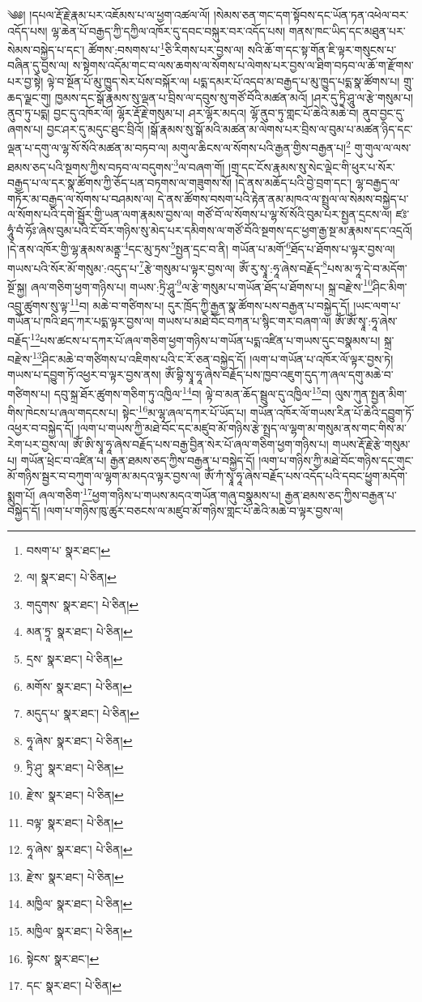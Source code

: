 \setcounter{footnote}{0} 
༄༅། །དཔལ་རྡོ་རྗེ་རྣམ་པར་འཇོམས་པ་ལ་ཕྱག་འཚལ་ལོ། །སེམས་ཅན་གང་དག་སྟོབས་དང་ཡོན་ཏན་འཕེལ་བར་འདོད་པས། ལྷ་ཆེན་པོ་བརྒྱད་ཀྱི་དཀྱིལ་འཁོར་དུ་དབང་བསྐུར་བར་འདོད་པས། གནས་ཁང་ཡིད་དང་མཐུན་པར་སེམས་བསྐྱེད་པ་དང་། ཚོགས་:བསགས་པ་\footnote{བསག་པ་  སྣར་ཐང་། }ཅི་རིགས་པར་བྱས་ལ། སའི་ཆོ་ག་དང་སྟ་གོན་ཇི་ལྟར་གསུངས་པ་བཞིན་དུ་བྱས་ལ། ས་སྟེགས་འདོམ་གང་བ་ལས་ཆགས་ལ་སོགས་པ་ལེགས་པར་བྱས་ལ་ཐིག་བཏབ་ལ་ཆོ་ག་རྫོགས་པར་བྱ་སྟེ། ལྟེ་བ་སྔོན་པོ་མུ་ཁྱུད་སེར་པོས་བསྐོར་ལ། པདྨ་དམར་པོ་འདབ་མ་བརྒྱད་པ་མུ་ཁྱུད་པདྨ་སྣ་ཚོགས་པ། གྲུ་ཆད་ལྗང་གུ། ཁྱམས་དང་སྒོ་རྣམས་སུ་ལྡན་པ་བྲིས་ལ་དབུས་སུ་གཙོ་བོའི་མཚན་མའོ། །ཤར་དུ་ཏྲི་ཤཱུ་ལ་རྩེ་གསུམ་པ། ནུབ་ཏུ་པདྨ། བྱང་དུ་འཁོར་ལོ། ལྷོར་རྡོ་རྗེ་གསུམ་པ། ཤར་ལྷོར་མདའ། ལྷོ་ནུབ་ཏུ་གླང་པོ་ཆེའི་མཆེ་བ། ནུབ་བྱང་དུ་ཞགས་པ། བྱང་ཤར་དུ་མདུང་ཐུང་བྲིའོ། །སྒོ་རྣམས་སུ་སྒོ་མའི་མཚན་མ་ལེགས་པར་བྲིས་ལ་བུམ་པ་མཚན་ཉིད་དང་ལྡན་པ་དགུ་ལ་ལྷ་སོ་སོའི་མཚན་མ་བཏབ་ལ། མགུལ་ཆིངས་ལ་སོགས་པའི་རྒྱན་གྱིས་བརྒྱན་པ།\footnote{ལ།  སྣར་ཐང་།  པེ་ཅིན། } གུ་གུལ་ལ་ལས་ཐམས་ཅད་པའི་སྔགས་ཀྱིས་བཏབ་ལ་བདུགས་\footnote{གདུགས་  སྣར་ཐང་།  པེ་ཅིན། }ལ་བཞག་གོ། །གྲྭ་དང་ངོས་རྣམས་སུ་སེང་ལྡེང་གི་ཕུར་པ་སོར་བརྒྱད་པ་ལ་དར་སྣ་ཚོགས་ཀྱི་ཅོད་པན་བཏགས་ལ་གཟུགས་སོ། །དེ་ནས་མཆོད་པའི་བྱེ་བྲག་དང་། ལྷ་བརྒྱད་ལ་གཏོར་མ་བརྒྱད་ལ་སོགས་པ་བཤམས་ལ། དེ་ནས་ཚོགས་བསག་པའི་རྟེན་ནམ་མཁའ་ལ་སྤྲུལ་ལ་སེམས་བསྐྱེད་པ་ལ་སོགས་པའི་དགེ་སྦྱོར་གྱི་ཡན་ལག་རྣམས་བྱས་ལ། གཙོ་བོ་ལ་སོགས་པ་ལྷ་སོ་སོའི་བུམ་པར་སྤྱན་དྲངས་ལ། ཛཿ་ཧཱུཾ་བཾ་ཧོཿ་ཞེས་བུམ་པའི་ངོ་བོར་གཉིས་སུ་མེད་པར་དམིགས་ལ་གཙོ་བོའི་སྔགས་དང་ཕྱག་རྒྱ་སྔ་མ་རྣམས་དང་འདྲའོ། །དེ་ནས་འཁོར་གྱི་ལྷ་རྣམས་མནྟྲ་\footnote{མན་ཏྲཱ་  སྣར་ཐང་།  པེ་ཅིན། }དང་མུ་ཏྲས་\footnote{དྲས་  སྣར་ཐང་།  པེ་ཅིན། }སྤྱན་དྲང་བ་ནི། གཡོན་པ་མགོ་\footnote{མགོས་  སྣར་ཐང་།  པེ་ཅིན། }ཐོད་པ་ཐོགས་པ་ལྟར་བྱས་ལ། གཡས་པའི་སོར་མོ་གསུམ་:འདུད་པ་\footnote{མདུད་པ་  སྣར་ཐང་།  པེ་ཅིན། }རྩེ་གསུམ་པ་ལྟར་བྱས་ལ། ཨོཾ་རུ་སྭཱ་:ཧཱ་ཞེས་བརྗོད་\footnote{ཧཱ་ཞེས་  སྣར་ཐང་།  པེ་ཅིན། }པས་མ་ཧཱ་དེ་བ་མདོག་སྔོ་སྐྱ། ཞལ་གཅིག་ཕྱག་གཉིས་པ། གཡས་:ཏྲི་ཤཱུ་\footnote{ཏྲི་ཤུ་  སྣར་ཐང་།  པེ་ཅིན། }ལ་རྩེ་གསུམ་པ་གཡོན་ཐོད་པ་ཐོགས་པ། སྐྲ་བརྫེས་\footnote{རྫེས་  སྣར་ཐང་།  པེ་ཅིན། }ཤིང་མིག་འབྲུ་ཚུགས་སུ་ལྟ་\footnote{བལྟ་  སྣར་ཐང་།  པེ་ཅིན། }བ། མཆེ་བ་གཙིགས་པ། དུར་ཁྲོད་ཀྱི་རྒྱན་སྣ་ཚོགས་པས་བརྒྱན་པ་བསྐྱེད་དོ། །ཡང་ལག་པ་གཡོན་པ་ཁའི་ཐད་ཀར་པདྨ་ལྟར་བྱས་ལ། གཡས་པ་མཐེ་བོང་བཀན་པ་སྙིང་གར་བཞག་ལ། ཨོཾ་ཨོཾ་སྭཱ་:ཧཱ་ཞེས་བརྗོད་\footnote{ཧཱ་ཞེས་  སྣར་ཐང་།  པེ་ཅིན། }པས་ཚངས་པ་དཀར་པོ་ཞལ་གཅིག་ཕྱག་གཉིས་པ་གཡོན་པདྨ་འཛིན་པ་གཡས་དུང་བསྣམས་པ། སྐྲ་བརྫེས་\footnote{རྫེས་  སྣར་ཐང་།  པེ་ཅིན། }ཤིང་མཆེ་བ་གཙིགས་པ་འཇིགས་པའི་ང་རོ་ཅན་བསྐྱེད་དོ། །ལག་པ་གཡོན་པ་འཁོར་ལོ་ལྟར་བྱས་ཏེ། གཡས་པ་དབྱུག་ཏོ་འཕྱར་བ་ལྟར་བྱས་ནས། ཨོཾ་བྷི་སྭཱ་ཧཱ་ཞེས་བརྗོད་པས་ཁྱབ་འཇུག་དུད་ཀ་ཞལ་དགུ་མཆེ་བ་གཙིགས་པ། དབུ་སྐྲ་ཐོར་ཚུགས་གཅིག་ཏུ་འཁྱིལ་\footnote{མཁྱིལ་  སྣར་ཐང་།  པེ་ཅིན། }བ། ལྟེ་བ་མན་ཆོད་སྦྲུལ་དུ་འཁྱིལ་\footnote{མཁྱིལ་  སྣར་ཐང་།  པེ་ཅིན། }བ། ལུས་ཀུན་སྤྱན་མིག་གིས་ཁེངས་པ་ཞལ་གདངས་པ། སྟེང་\footnote{སྟེངས་  སྣར་ཐང་། }མ་ལྷ་ཞལ་དཀར་པོ་ཡོད་པ། གཡོན་འཁོར་ལོ་གཡས་རིན་པོ་ཆེའི་དབྱུག་ཏོ་འཕྱར་བ་བསྐྱེད་དོ། །ལག་པ་གཡས་ཀྱི་མཐེ་བོང་དང་མཛུབ་མོ་གཉིས་རྩེ་སྤྲད་ལ་ལྷག་མ་གསུམ་ནས་གང་གིས་མ་རེག་པར་བྱས་ལ། ཨོཾ་ཨི་སྭཱ་ཧཱ་ཞེས་བརྗོད་པས་བརྒྱ་བྱིན་སེར་པོ་ཞལ་གཅིག་ཕྱག་གཉིས་པ། གཡས་རྡོ་རྗེ་རྩེ་གསུམ་པ། གཡོན་ཕྲེང་བ་འཛིན་པ། རྒྱན་ཐམས་ཅད་ཀྱིས་བརྒྱན་པ་བསྐྱེད་དོ། །ལག་པ་གཉིས་ཀྱི་མཐེ་བོང་གཉིས་དང་གུང་མོ་གཉིས་སྦྱར་བ་བཀུག་ལ་ལྷག་མ་མདའ་ལྟར་བྱས་ལ། ཨོཾ་ཀཾ་སྭཱ་ཧཱ་ཞེས་བརྗོད་པས་འདོད་པའི་དབང་ཕྱུག་མདོག་སྨུག་པོ། ཞལ་གཅིག་\footnote{དང་  སྣར་ཐང་།  པེ་ཅིན། }ཕྱག་གཉིས་པ་གཡས་མདའ་གཡོན་གཞུ་བསྣམས་པ། རྒྱན་ཐམས་ཅད་ཀྱིས་བརྒྱན་པ་བསྐྱེད་དོ། །ལག་པ་གཉིས་ཁུ་ཚུར་བཅངས་ལ་མཛུབ་མོ་གཉིས་གླང་པོ་ཆེའི་མཆེ་བ་ལྟར་བྱས་ལ། 